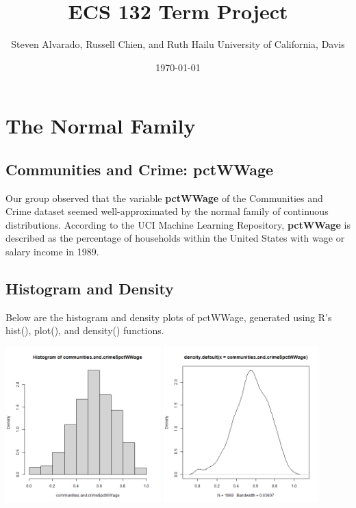 \documentclass[12pt, letterpaper]{report}
\title{\textbf{ECS 132 Term Project}}
\author{\parbox{\linewidth}{\centering%
  Steven Alvarado, Russell Chien, and Ruth Hailu\endgraf\bigskip
  University of California, Davis}}
\date{\monthyeardate\today}
\begin{document}
\maketitle



\chapter{The Normal Family}
\section{Communities and Crime: pctWWage}
Our group observed that the variable \textbf{pctWWage} of the Communities and Crime dataset seemed well-approximated by the normal family of continuous distributions.
According to the UCI Machine Learning Repository, \textbf{pctWWage} is described as the percentage of households within the United States with wage or salary income in 1989.

\section{Histogram and Density}
Below are the histogram and density plots of pctWWage, generated using R's hist(), plot(), and density() functions.
\begin{center}
\includegraphics[width=0.45\textwidth]{normal/pctWWage_hist}
\includegraphics[width=0.45\textwidth]{normal/pctWWage_density}
\end{center}
\end{document}
